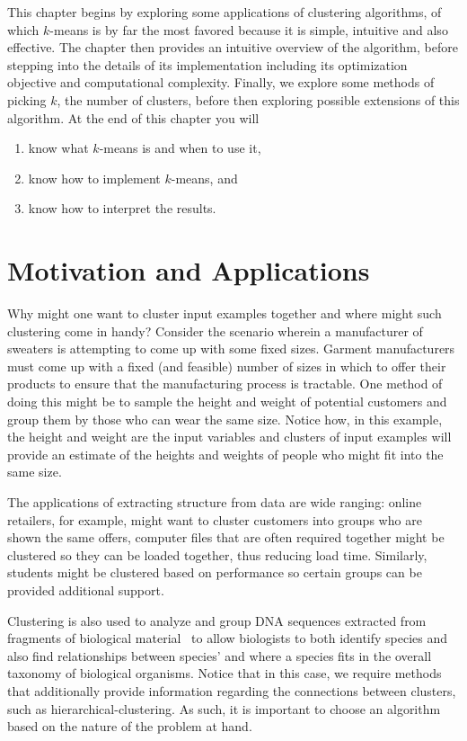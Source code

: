 This chapter begins by exploring some applications of clustering algorithms, of which $k$-means is by far the most favored because it is simple, intuitive and also effective. The chapter then provides an intuitive overview of the algorithm, before stepping into the details of its implementation including its optimization objective and computational complexity. Finally, we explore some methods of picking $k$, the number of clusters, before then exploring possible extensions of this algorithm. At the end of this chapter you will \begin{enumerate}[label=(\alph*)]
\item know what $k$-means is and when to use it, 
\item know how to implement $k$-means, and
\item know how to interpret the results. 
\end{enumerate}

\section{Motivation and Applications}

Why might one want to cluster input examples together and where might such clustering come in handy? Consider the scenario wherein a manufacturer of sweaters is attempting to come up with some fixed sizes. Garment manufacturers must come up with a fixed (and feasible) number of sizes in which to offer their products to ensure that the manufacturing process is tractable. One method of doing this might be to sample the height and weight of potential customers and group them by those who can wear the same size. Notice how, in this example, the height and weight are the input variables and clusters of input examples will provide an estimate of the heights and weights of people who might fit into the same size. 

The applications of extracting structure from data are wide ranging: online retailers, for example, might want to cluster customers into groups who are shown the same offers, computer files that are often required together might be clustered so they can be loaded together, thus reducing load time. Similarly, students might be clustered based on performance so certain groups can be provided additional support.

Clustering is also used to analyze and group DNA sequences extracted from fragments of biological material~\cite{mbs:/content/journal/ijsem/10.1099/00207713-47-4-1145} to allow biologists to both identify species and also find relationships between species' and where a species fits in the overall taxonomy of biological organisms. Notice that in this case, we require methods that additionally provide information regarding the connections between clusters, such as hierarchical-clustering. As such, it is important to choose an algorithm based on the nature of the problem at hand. 

